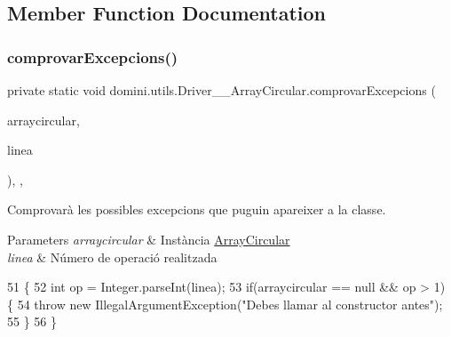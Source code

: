 \subsection{Member Function Documentation}
\mbox{\label{classdomini_1_1utils_1_1Driver____ArrayCircular_a0f5f42c5ace9176cfcae4dfe9717f380}} 
\subsubsection{\texorpdfstring{comprovar\+Excepcions()}{comprovarExcepcions()}}
{\footnotesize\ttfamily private static void domini.\+utils.\+Driver\+\_\+\+\_\+\+Array\+Circular.\+comprovar\+Excepcions (\begin{DoxyParamCaption}\item[{\hyperlink{classdomini_1_1utils_1_1ArrayCircular}{Array\+Circular}}]{arraycircular,  }\item[{String}]{linea }\end{DoxyParamCaption})\hspace{0.3cm}{\ttfamily [inline]}, {\ttfamily [static]}, {\ttfamily [private]}}



Comprovarà les possibles excepcions que puguin apareixer a la classe. 


\begin{DoxyParams}{Parameters}
{\em arraycircular} & Instància \hyperlink{classdomini_1_1utils_1_1ArrayCircular}{Array\+Circular} \\
\hline
{\em linea} & Número de operació realitzada \\
\hline
\end{DoxyParams}

\begin{DoxyCode}
51                                                                                       \{
52         \textcolor{keywordtype}{int} op = Integer.parseInt(linea);
53         \textcolor{keywordflow}{if}(arraycircular == null && op > 1) \{
54             \textcolor{keywordflow}{throw} \textcolor{keyword}{new} IllegalArgumentException(\textcolor{stringliteral}{"Debes llamar al constructor antes"});
55         \}
56     \}
\end{DoxyCode}
\mbox{\label{classdomini_1_1utils_1_1Driver____ArrayCircular_adf8b1dedd521248da8a5f1425dd27af8}} 
